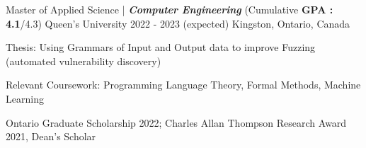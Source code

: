 

\begin{cventries}

  \cventry
    {Master of Applied Science | \textit{\textbf{Computer Engineering}} (\normalsize{Cumulative \textbf{GPA : 4.1}/4.3)}} %
    {Queen's University} %
    {2022 - 2023 (expected)} %
    {Kingston, Ontario, Canada} %
    {
    \begin{cvitems} %
        \item {Thesis: Using Grammars of Input and Output data to improve Fuzzing (automated vulnerability discovery)}
        \item {Relevant Coursework: Programming Language Theory, Formal Methods, Machine Learning}
        \item{Ontario Graduate Scholarship 2022; Charles Allan Thompson Research Award 2021, Dean's Scholar}
      \end{cvitems}
    }


\end{cventries}
